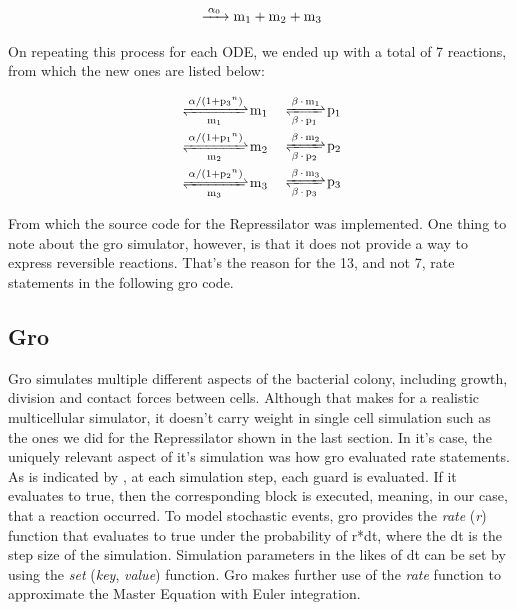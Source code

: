 \documentclass[12pt]{article}
\begin{document}
    \begin{equation}
    \ce{ ->[\alpha_{0}] m_{1} + m_{2} + m_{3}}
    \end{equation}
    
    On repeating this process for each ODE, we ended up with a total of 7 reactions, from which the new ones are listed below:
    
    \begin{equation}
    \begin{aligned}[c]
        \ce{ <=>[\alpha/(1 + p_{3}^n)][m_{1}] m_{1}} & & \\
        \ce{ <=>[\alpha/(1 + p_{1}^n)][m_{2}] m_{2}} & & \\
        \ce{ <=>[\alpha/(1 + p_{2}^n)][m_{3}] m_{3}} & &
    \end{aligned}
    \begin{aligned}[c]
        \ce{ <=>[\beta*m_{1}][\beta*p_{1}] p_{1}} \\
        \ce{ <=>[\beta*m_{2}][\beta*p_{2}] p_{2}} \\
        \ce{ <=>[\beta*m_{3}][\beta*p_{3}] p_{3}}
    \end{aligned}
    \end{equation}
    
    From which the source code for the Repressilator was implemented. One thing to note about the gro simulator, however, is that it does not provide a way to express reversible reactions. That's the reason for the 13, and not 7, rate statements in the following gro code.
    
    

\subsection{Gro}
    
    Gro simulates multiple different aspects of the bacterial colony, including growth, division and contact forces between cells. Although that makes for a realistic multicellular simulator, it doesn't carry weight in single cell simulation such as the ones we did for the Repressilator shown in the last section. In it's case, the uniquely relevant aspect of it's simulation was how gro evaluated rate statements. As is indicated by \cite{Hoops2006}, at each simulation step, each guard is evaluated. If it evaluates to true, then the corresponding block is executed, meaning, in our case, that a reaction occurred. To model stochastic events, gro provides the \textit{rate} (\textit{r}) function that evaluates to true under the probability of r*dt, where the dt is the step size of the simulation. Simulation parameters in the likes of dt can be set by using the \textit{set} (\textit{key}, \textit{value}) function. Gro makes further use of the \textit{rate} function to approximate the Master Equation with Euler integration. 
\end{document}
